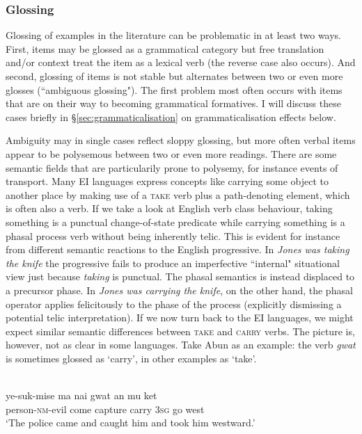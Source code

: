 \subsubsection{Glossing} \label{sec:verbglossing}

Glossing of examples in the literature can be problematic in at least two ways. First, items may be glossed as a grammatical category but free translation and/or context treat the item as a lexical verb (the reverse case also occurs). And second, glossing of items is not stable but alternates between two or even more glosses (``ambiguous glossing"). The first problem most often occurs with items that are on their way to becoming grammatical formatives. I will discuss these cases briefly in §\ref{sec:grammaticalisation} on grammaticalisation effects below.

Ambiguity may in single cases reflect sloppy glossing, but more often verbal items appear to be polysemous between two or even more readings. There are some semantic fields that are particularily prone to polysemy, for instance events of transport. Many EI languages express concepts like carrying some object to another place by making use of a \textsc{take} verb plus a path-denoting element, which is often also a verb. If we take a look at English verb class behaviour, taking something is a punctual change-of-state predicate while carrying something is a phasal process verb without being inherently telic. This is evident for instance from different semantic reactions to the English progressive. In \textit{Jones was taking the knife} the progressive fails to produce an imperfective ``internal" situational view just because \textit{taking} is punctual. The phasal semantics is instead displaced to a precursor phase. In \textit{Jones was carrying the knife}, on the other hand, the phasal operator applies felicitously to the phase of the process (explicitly dismissing a potential telic interpretation). If we now turn back to the EI languages, we might expect similar semantic differences between \textsc{take} and \textsc{carry} verbs. The picture is, however, not as clear in some languages. Take Abun as an example: the verb \textit{gwat} is sometimes glossed as `carry', in other examples as `take'.

\ea 
{}\\
\gll ye-suk-mise ma nai gwat an mu ket \\
person-\textsc{nm}-evil come capture carry 3\textsc{sg} go west \\
\glft `The police came and caught him and took him westward.'\\ 
\z

